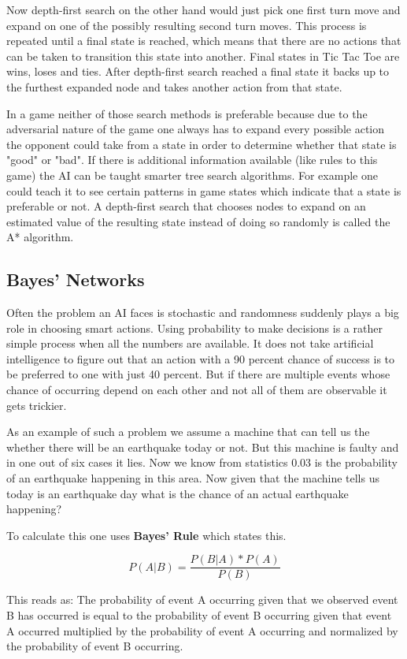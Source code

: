 Now depth-first search on the other hand would just pick one first turn move and expand on one of the possibly resulting second turn moves. This process is repeated until a final state is reached, which means that there are no actions that can be taken to transition this state into another. Final states in Tic Tac Toe are wins, loses and ties. After depth-first search reached a final state it backs up to the furthest expanded node and takes another action from that state.

In a game neither of those search methods is preferable because due to the adversarial nature of the game one always has to expand every possible action the opponent could take from a state in order to determine whether that state is "good" or "bad". If there is additional information available (like rules to this game) the AI can be taught smarter tree search algorithms. For example one could teach it to see certain patterns in game states which indicate that a state is preferable or not. A depth-first search that chooses nodes to expand on an estimated value of the resulting state instead of doing so randomly is called the A* algorithm.

\subsection{Bayes' Networks}

Often the problem an AI faces is stochastic and randomness suddenly plays a big role in choosing smart actions. Using probability to make decisions is a rather simple process when all the numbers are available. It does not take artificial intelligence to figure out that an action with a 90 percent chance of success is to be preferred to one with just 40 percent. But if there are multiple events whose chance of occurring depend on each other and not all of them are observable it gets trickier.

As an example of such a problem we assume a machine that can tell us the whether there will be an earthquake today or not. But this machine is faulty and in one out of six cases it lies. Now we know from statistics 0.03 is the probability of an earthquake happening in this area. Now given that the machine tells us today is an earthquake day what is the chance of an actual earthquake happening?

To calculate this one uses {\bf Bayes' Rule} which states this. 

\[P(A|B)=\frac{P(B|A) * P(A)}{P(B)}\]

This reads as: The probability of event A occurring given that we observed event B has occurred is equal to the probability of event B occurring given that event A occurred multiplied by the probability of event A occurring and normalized by the probability of event B occurring.

